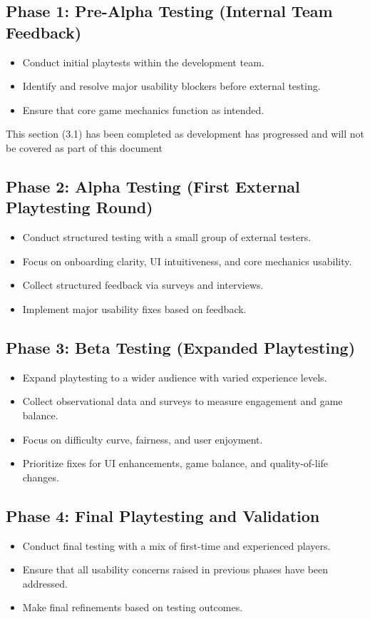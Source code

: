 \documentclass{article}
\begin{document}
\subsection{Phase 1: Pre-Alpha Testing (Internal Team Feedback)}
\begin{itemize}
    \item Conduct initial playtests within the development team.
    \item Identify and resolve major usability blockers before external testing.
    \item Ensure that core game mechanics function as intended.
\end{itemize}
This section (3.1) has been completed as development has progressed and will not be covered as part of this document

\subsection{Phase 2: Alpha Testing (First External Playtesting Round)}
\begin{itemize}
    \item Conduct structured testing with a small group of external testers.
    \item Focus on onboarding clarity, UI intuitiveness, and core mechanics usability.
    \item Collect structured feedback via surveys and interviews.
    \item Implement major usability fixes based on feedback.
\end{itemize}

\subsection{Phase 3: Beta Testing (Expanded Playtesting)}
\begin{itemize}
    \item Expand playtesting to a wider audience with varied experience levels.
    \item Collect observational data and surveys to measure engagement and game balance.
    \item Focus on difficulty curve, fairness, and user enjoyment.
    \item Prioritize fixes for UI enhancements, game balance, and quality-of-life changes.
\end{itemize}

\subsection{Phase 4: Final Playtesting and Validation}
\begin{itemize}
    \item Conduct final testing with a mix of first-time and experienced players.
    \item Ensure that all usability concerns raised in previous phases have been addressed.
    \item Make final refinements based on testing outcomes.
\end{itemize}
\end{document}
